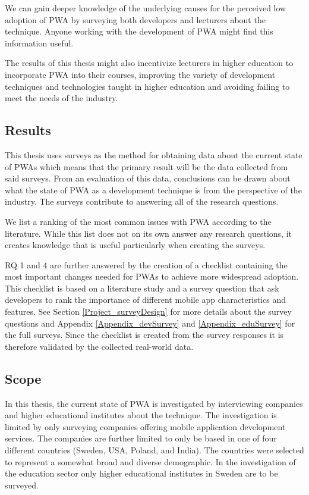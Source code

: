 \documentclass[a4paper,12pt]{article}
\begin{document}
We can gain deeper knowledge of the underlying causes for the perceived low adoption of PWA by surveying both developers and lecturers about the technique. Anyone working with the development of PWA might find this information useful.  

The results of this thesis might also incentivize lecturers in higher education to incorporate PWA into their courses, improving the variety of development techniques and technologies taught in higher education and avoiding failing to meet the needs of the industry.

\subsection{Results}
\label{Intro_results}
This thesis uses surveys as the method for obtaining data about the current state of PWAs which means that the primary result will be the data collected from said surveys. From an evaluation of this data, conclusions can be drawn about what the state of PWA as a development technique is from the perspective of the industry. The surveys contribute to answering all of the research questions.

We list a ranking of the most common issues with PWA according to the literature. While this list does not on its own answer any research questions, it creates knowledge that is useful particularly when creating the surveys.

RQ 1 and 4 are further answered by the creation of a checklist containing the most important changes needed for PWAs to achieve more widespread adoption. This checklist is based on a literature study and a survey question that ask developers to rank the importance of different mobile app characteristics and features. See Section \ref{Project_surveyDesign} for more details about the survey questions and Appendix \ref{Appendix_devSurvey} and \ref{Appendix_eduSurvey} for the full surveys. Since the checklist is created from the survey responses it is therefore validated by the collected real-world data.

\subsection{Scope}
\label{Intro_scope}
In this thesis, the current state of PWA is investigated by interviewing companies and higher educational institutes about the technique. The investigation is limited by only surveying companies offering mobile application development services. The companies are further limited to only be based in one of four different countries (Sweden, USA, Poland, and India). The countries were selected to represent a somewhat broad and diverse demographic. In the investigation of the education sector only higher educational institutes in Sweden are to be surveyed.
\end{document}
